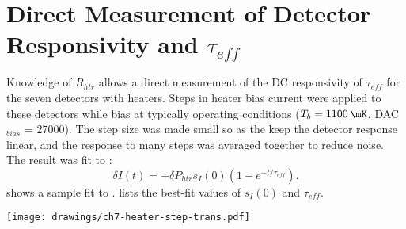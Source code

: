 \section{Direct Measurement of Detector Responsivity and $\tau_{eff}$} \label{sec:teff-resp}

Knowledge of $R_{htr}$ allows a direct measurement of the DC responsivity of $\tau_{eff}$ for the seven detectors with heaters.
Steps in heater bias current were applied to these detectors while bias at typically operating conditions ($T_b = \SI{1100}{\mK}$, DAC$_{bias}$ = 27000).
The step size was made small so as the keep the detector response linear, and the response to many steps was averaged together to reduce noise.
The result was fit to :
\begin{equation} \label{eqn:ch7-heater-step-trans}
  \delta I(t) = - \delta P_{htr} s_I(0) (1 - e^{-t/\tau_{eff}}).
\end{equation}
 shows a sample fit to .
 lists the best-fit values of $s_I(0)$ and $\tau_{eff}$.

\begin{figure*}
\centering
\texttt{[image: drawings/ch7-heater-step-trans.pdf]}
\caption{Plot showing response of detector  to step in applied heater power of \SI{1.41}{\pico\watt}.
Plots are for  biased into normal operating conditions.
Data acquired at \SI{3125}{\Hz}.
Data averaged over 32 steps (16 up and 16 down) along with best fit to .
The step in applied power begins at $t \approx \SI{0.6}{\ms}$, not $t = \SI{0}{\ms}$.
} 
\label{fig:ch7-heater-step-trans}
\end{figure*}


